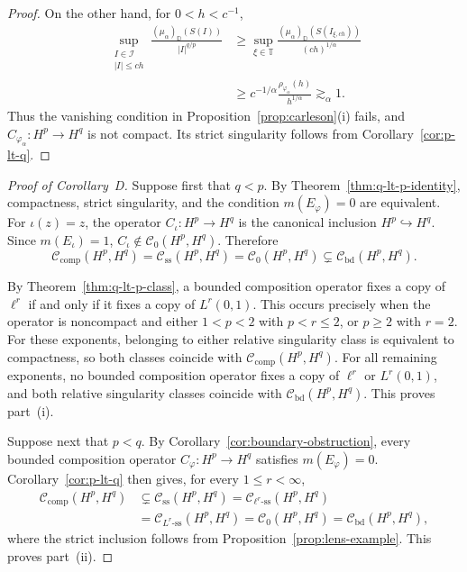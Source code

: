 \documentclass[11pt, reqno]{amsart}
\theoremstyle{definition}
\theoremstyle{remark}
\newcommand{\D}{\mathbb{D}}
\newcommand{\T}{\mathbb{T}}
\newcommand{\CB}{\mathcal C_{\mathrm{bd}}}
\newcommand{\CK}{\mathcal C_{\mathrm{comp}}}
\newcommand{\CS}{\mathcal C_{\mathrm{ss}}}
\newcommand{\CSell}[1]{\mathcal C_{\ell^{#1}\text{-ss}}}
\newcommand{\CSL}[1]{\mathcal C_{L^{#1}\text{-ss}}}
\begin{document}
\begin{proof}
On the other hand, for \(0<h<c^{-1}\),
\[
\begin{aligned}
        \sup_{\substack{I\in\mathcal I\\ |I|\le ch}}
        \frac{(\mu_\alpha)_\D(S(I))}{|I|^{q/p}}
        &\ge
        \sup_{\xi\in\T}
        \frac{(\mu_\alpha)_\D(S(I_{\xi,ch}))}{(ch)^{1/\alpha}}\\
        &\ge
        c^{-1/\alpha}
        \frac{\rho_{\varphi_\alpha}(h)}{h^{1/\alpha}}
        \gtrsim_\alpha 1.
\end{aligned}
\]
Thus the vanishing condition in
Proposition~\ref{prop:carleson}\textup{(i)} fails, and
\(C_{\varphi_\alpha}:H^p\to H^q\) is not compact. Its strict
singularity follows from
Corollary~\ref{cor:p-lt-q}.
\end{proof}

\begin{proof}[Proof of Corollary~D]
Suppose first that \(q<p\). By
Theorem~\ref{thm:q-lt-p-identity}, compactness, strict singularity,
and the condition \(m(E_\varphi)=0\) are equivalent. For
\(\iota(z)=z\), the operator \(C_\iota:H^p\to H^q\) is the canonical
inclusion \(H^p\hookrightarrow H^q\). Since \(m(E_\iota)=1\),
\(C_\iota\notin\mathcal C_0(H^p,H^q)\). Therefore
\[
        \CK(H^p,H^q)
        =
        \CS(H^p,H^q)
        =
        \mathcal C_0(H^p,H^q)
        \subsetneq
        \CB(H^p,H^q).
\]

By Theorem~\ref{thm:q-lt-p-class},
a bounded composition operator fixes a copy of \(\ell^r\) if and
only if it fixes a copy of \(L^r(0,1)\). This occurs precisely when
the operator is noncompact and either
\(1<p<2\) with \(p<r\le2\), or \(p\ge2\) with \(r=2\).
For these exponents, belonging to either relative singularity class
is equivalent to compactness, so both classes coincide with
\(\CK(H^p,H^q)\). For all remaining exponents, no bounded composition
operator fixes a copy of \(\ell^r\) or \(L^r(0,1)\), and both relative
singularity classes coincide with \(\CB(H^p,H^q)\). This proves
part~\textup{(i)}.

Suppose next that \(p<q\). By
Corollary~\ref{cor:boundary-obstruction}, every bounded
composition operator \(C_\varphi:H^p\to H^q\) satisfies
\(m(E_\varphi)=0\). Corollary~\ref{cor:p-lt-q}
then gives, for every \(1\le r<\infty\),
\[
\begin{aligned}
        \CK(H^p,H^q)
        &\subsetneq
        \CS(H^p,H^q)
        =
        \CSell{r}(H^p,H^q)\\
        &=
        \CSL{r}(H^p,H^q)
        =
        \mathcal C_0(H^p,H^q)
        =
        \CB(H^p,H^q),
\end{aligned}
\]
where the strict inclusion follows from
Proposition~\ref{prop:lens-example}. This proves
part~\textup{(ii)}.


\end{proof}
\end{document}
